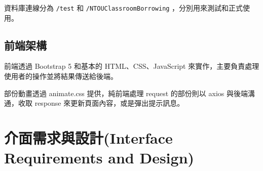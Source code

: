 \documentclass{article}
\begin{document}
資料庫連線分為 \verb|/test| 和 \verb|/NTOUClassroomBorrowing| ，分別用來測試和正式使用。

\subsection{前端架構}

前端透過 Bootstrap 5 和基本的 HTML、CSS、JavaScript 來實作，主要負責處理使用者的操作並將結果傳送給後端。

部份動畫透過 animate.css 提供，純前端處理 request 的部份則以 axios 與後端溝通，收取 response 來更新頁面內容，或是彈出提示訊息。

\newpage

\section[介面需求與設計(INTERFACE REQUIREMENTS AND DESIGN)]{介面需求與設計(Interface Requirements and Design)}

\newcommand{\IRTable}[6]{
	\begin{tabularx}{0.95\textwidth}{|c|Y|Y|}
		\hline
		\rowcolor{LightGray} 介面名稱              & 介面提供者                & 介面使用者                 \\
		\rowcolor{LightGray} (Interface Name)  & (Interface Provider) & (Interface Consumer)  \\ \hline
		#1                                     & #2                   & #3                    \\ \hline
		\rowcolor{LightGray} 連結方式              & 輸入資料                 & 輸出資料                  \\
		\rowcolor{LightGray} (Connection Type) & (Input Data)         & (Output Data)         \\ \hline
		\texttt{#4}                            & \usebox\jsoninputbox & \usebox\jsonoutputbox \\ \hline
		\rowcolor{LightGray} \multicolumn{3}{|c|}{ URL }                                      \\ \hline
		\multicolumn{3}{|c|}{\texttt{#5}}                                                     \\ \hline
		\rowcolor{LightGray} \multicolumn{3}{|c|}{  介面描述 (Interface Description) }            \\ \hline
		\multicolumn{3}{|c|}{#6}                                                              \\ \hline
	\end{tabularx}
}
\end{document}
